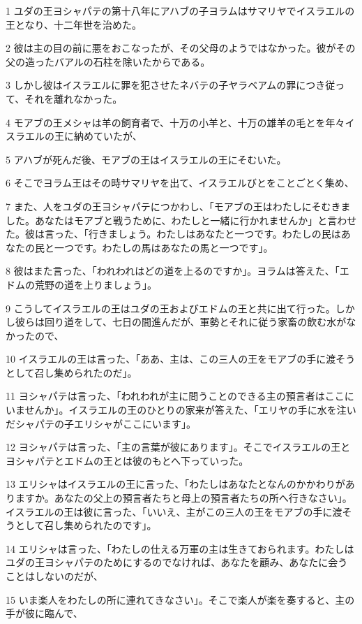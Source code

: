 \par 1 ユダの王ヨシャパテの第十八年にアハブの子ヨラムはサマリヤでイスラエルの王となり、十二年世を治めた。
\par 2 彼は主の目の前に悪をおこなったが、その父母のようではなかった。彼がその父の造ったバアルの石柱を除いたからである。
\par 3 しかし彼はイスラエルに罪を犯させたネバテの子ヤラベアムの罪につき従って、それを離れなかった。
\par 4 モアブの王メシャは羊の飼育者で、十万の小羊と、十万の雄羊の毛とを年々イスラエルの王に納めていたが、
\par 5 アハブが死んだ後、モアブの王はイスラエルの王にそむいた。
\par 6 そこでヨラム王はその時サマリヤを出て、イスラエルびとをことごとく集め、
\par 7 また、人をユダの王ヨシャパテにつかわし、「モアブの王はわたしにそむきました。あなたはモアブと戦うために、わたしと一緒に行かれませんか」と言わせた。彼は言った、「行きましょう。わたしはあなたと一つです。わたしの民はあなたの民と一つです。わたしの馬はあなたの馬と一つです」。
\par 8 彼はまた言った、「われわれはどの道を上るのですか」。ヨラムは答えた、「エドムの荒野の道を上りましょう」。
\par 9 こうしてイスラエルの王はユダの王およびエドムの王と共に出て行った。しかし彼らは回り道をして、七日の間進んだが、軍勢とそれに従う家畜の飲む水がなかったので、
\par 10 イスラエルの王は言った、「ああ、主は、この三人の王をモアブの手に渡そうとして召し集められたのだ」。
\par 11 ヨシャパテは言った、「われわれが主に問うことのできる主の預言者はここにいませんか」。イスラエルの王のひとりの家来が答えた、「エリヤの手に水を注いだシャパテの子エリシャがここにいます」。
\par 12 ヨシャパテは言った、「主の言葉が彼にあります」。そこでイスラエルの王とヨシャパテとエドムの王とは彼のもとへ下っていった。
\par 13 エリシャはイスラエルの王に言った、「わたしはあなたとなんのかかわりがありますか。あなたの父上の預言者たちと母上の預言者たちの所へ行きなさい」。イスラエルの王は彼に言った、「いいえ、主がこの三人の王をモアブの手に渡そうとして召し集められたのです」。
\par 14 エリシャは言った、「わたしの仕える万軍の主は生きておられます。わたしはユダの王ヨシャパテのためにするのでなければ、あなたを顧み、あなたに会うことはしないのだが、
\par 15 いま楽人をわたしの所に連れてきなさい」。そこで楽人が楽を奏すると、主の手が彼に臨んで、
